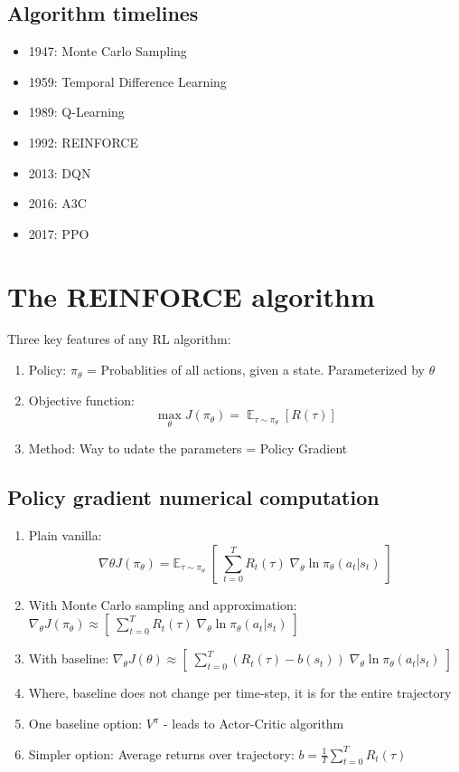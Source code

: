 \documentclass[a4paper, 12pt]{article}
\begin{document}
\subsection{Algorithm timelines}
\begin{itemize}
	\item 1947: Monte Carlo Sampling
	\item 1959: Temporal Difference Learning
	\item 1989: Q-Learning
	\item 1992: REINFORCE
	\item 2013: DQN
	\item 2016: A3C
	\item 2017: PPO 
\end{itemize}

\section{The REINFORCE algorithm}
Three key features of any RL algorithm:
\begin{enumerate}
	\item Policy: $\pi_\theta$ = Probablities of all actions, given a state. Parameterized by $\theta$
	\item Objective function:
	\begin{equation}
		\max_{\theta} J(\pi_{\theta}) = \mathop{\mathbb{E}}_{\tau \sim \pi_\theta} [R(\tau)]
	\end{equation}
	\item Method: Way to udate the parameters = Policy Gradient

\end{enumerate}

\subsection{Policy gradient numerical computation}

\begin{enumerate}
	\item Plain vanilla: 
	\begin{equation}
		\nabla \theta J(\pi_\theta) = \mathbb{E}_{\tau \sim \pi_\theta} \; [ \; \sum_{t=0}^T R_t(\tau) \; \nabla_\theta \ln \pi_\theta(a_t \vert s_t) \;]
	\end{equation}
	\item With Monte Carlo sampling and approximation: $\nabla_\theta J(\pi_\theta) \approx [ \; \sum_{t=0}^T R_t(\tau) \; \nabla_\theta \ln \pi_\theta(a_t \vert s_t) \;]$
	\item With baseline: $\nabla_\theta J(\theta) \approx [ \; \sum_{t=0}^T (R_t(\tau) - b(s_t)) \; \nabla_\theta \ln \pi_\theta(a_t \vert s_t) \;]$
	\item Where, baseline does not change per time-step, it is for the entire trajectory
	\item One baseline option: $V^\pi$ - leads to Actor-Critic algorithm
	\item Simpler option: Average returns over trajectory: $b = \frac{1}{T}\sum_{t=0}^T R_t(\tau) $
\end{enumerate}
\end{document}
